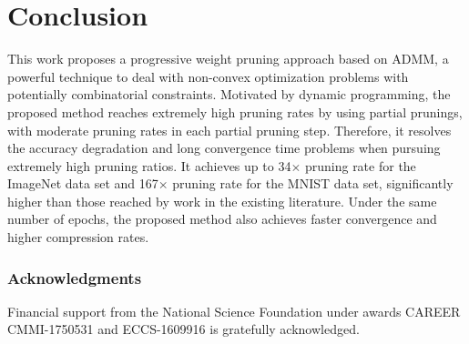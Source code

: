 \documentclass{article} %
\begin{document}
\section{Conclusion}
This work proposes a progressive weight pruning approach based on ADMM, a powerful technique to deal with non-convex optimization problems with potentially combinatorial constraints.
Motivated by dynamic programming, the proposed method reaches extremely high pruning rates by using partial prunings, with moderate pruning rates in each partial pruning step.
Therefore, it resolves the accuracy degradation and long convergence time problems when pursuing extremely high pruning ratios.
It achieves up to 34$\times$ pruning rate for the ImageNet data set and 167$\times$ pruning rate for the MNIST data set, significantly higher than those reached by work in the existing literature.
Under the same number of epochs, the proposed method also achieves faster convergence and higher compression rates.



























\subsubsection*{Acknowledgments}

Financial support from the National Science Foundation under
awards CAREER CMMI-1750531 and ECCS-1609916 is gratefully acknowledged.

% 
% 
\end{document}
